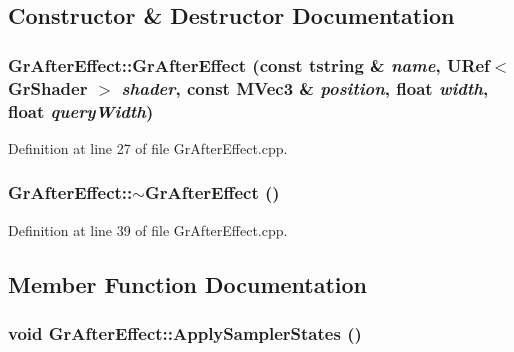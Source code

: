 \subsection{Constructor \& Destructor Documentation}
\hypertarget{class_gr_after_effect_99b71b5f881a5e958b9cc9f1c9c4e571}{
\subsubsection[{GrAfterEffect}]{\setlength{\rightskip}{0pt plus 5cm}GrAfterEffect::GrAfterEffect (const {\bf tstring} \& {\em name}, \/  {\bf URef}$<$ {\bf GrShader} $>$ {\em shader}, \/  const {\bf MVec3} \& {\em position}, \/  float {\em width}, \/  float {\em queryWidth})}}
\label{class_gr_after_effect_99b71b5f881a5e958b9cc9f1c9c4e571}




Definition at line 27 of file GrAfterEffect.cpp.\hypertarget{class_gr_after_effect_f62d61f3e398d41ef45843d37a4cd6ca}{
\subsubsection[{$\sim$GrAfterEffect}]{\setlength{\rightskip}{0pt plus 5cm}GrAfterEffect::$\sim$GrAfterEffect ()}}
\label{class_gr_after_effect_f62d61f3e398d41ef45843d37a4cd6ca}




Definition at line 39 of file GrAfterEffect.cpp.

\subsection{Member Function Documentation}
\hypertarget{class_gr_after_effect_d05cf40a9229d30ffa9148dc2f977d87}{
\subsubsection[{ApplySamplerStates}]{\setlength{\rightskip}{0pt plus 5cm}void GrAfterEffect::ApplySamplerStates ()}}
\label{class_gr_after_effect_d05cf40a9229d30ffa9148dc2f977d87}




